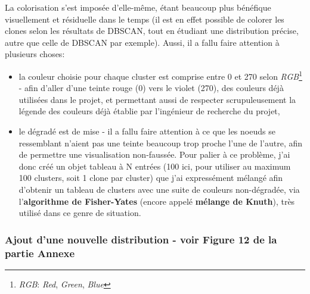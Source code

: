 \documentclass[12pt]{report}
\begin{document}
\begin{spacing}{1.2}
La colorisation s'est imposée d'elle-même, étant beaucoup plus bénéfique visuellement et résiduelle dans le temps (il est en effet possible de colorer les clones selon les résultats de DBSCAN, tout en étudiant une distribution précise, autre que celle de DBSCAN par exemple).
\newline
Aussi, il a fallu faire attention à plusieurs choses:
	\begin{itemize}
		\item{la couleur choisie pour chaque cluster est comprise entre 0 et 270 selon \textit{RGB}\footnote{\textit{RGB}: \textit{Red}, \textit{Green}, \textit{Blue}} - afin d'aller d'une teinte rouge (0) vers le violet (270), des couleurs déjà utilisées dans le projet, et permettant aussi de respecter scrupuleusement la légende des couleurs déjà établie par l'ingénieur de recherche du projet,}
		\item{le dégradé est de mise - il a fallu faire attention à ce que les noeuds se ressemblant n'aient pas une teinte beaucoup trop proche l'une de l'autre, afin de permettre une visualisation non-faussée.
			\newline
			Pour palier à ce problème, j'ai donc créé un objet tableau à N entrées (100 ici, pour utiliser au maximum 100 clusters, soit 1 clone par cluster) que j'ai expressément mélangé afin d'obtenir un tableau de clusters avec une suite de couleurs non-dégradée, via l'\textbf{algorithme de Fisher-Yates} (encore appelé \textbf{mélange de Knuth}), très utilisé dans ce genre de situation.}
	\end{itemize}

\subsubsection{Ajout d'une nouvelle distribution - voir \textbf{Figure 12} de la partie \textbf{Annexe}}


\end{spacing}
\end{document}
